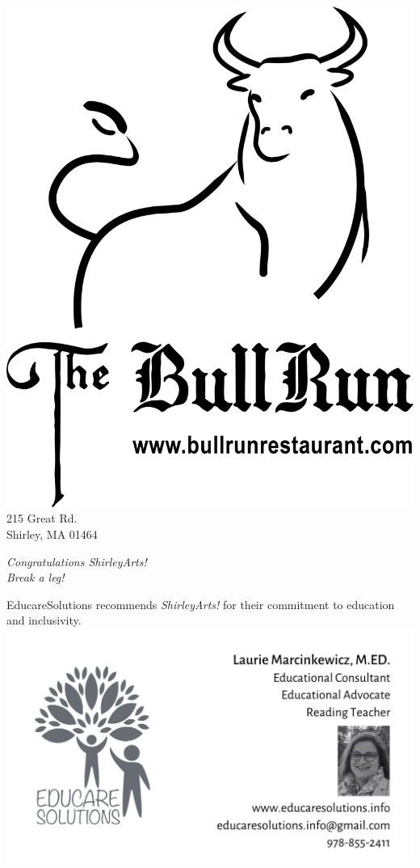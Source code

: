 \documentclass[12pt, a5paper, oneside]{article}
\begin{document}
\begin{framed}
\begin{minipage}[c][0.5\textheight]{0.4\linewidth}
	\centering
    \includegraphics[scale=0.05]{media/bull_logo_black_large.png}\\
    \small{215 Great Rd.\\
    Shirley, MA 01464}
\end{minipage}
\begin{minipage}[c][0.5\textheight]{0.4\linewidth}
\centering
   \Large \textit{Congratulations ShirleyArts!\\
   Break a leg!}
\end{minipage}
\end{framed}
\begin{framed}
EducareSolutions recommends \textit{ShirleyArts!} for their commitment to education and inclusivity.\\
\includegraphics[scale=1.1]{media/educare_business_card.png}
\end{framed}
\end{document}
